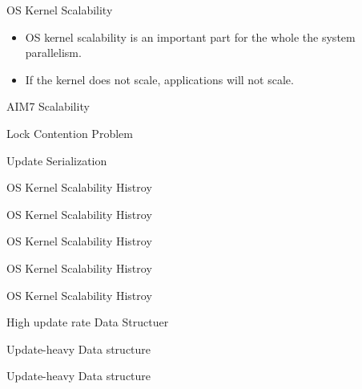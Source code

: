 \documentclass[english]{beamer} %
\begin{document}
\begin{frame}{OS Kernel Scalability}
    \begin{itemize}[<+-| alert@+>]
    \item OS kernel scalability is an important part for the whole the system
    parallelism.
    \item If the kernel does not scale, applications will not scale.
    \end{itemize}
\end{frame}


\begin{frame}{AIM7 Scalability}
\end{frame}


\begin{frame}{Lock Contention Problem}

\end{frame}


\begin{frame}{Update Serialization}

\end{frame}



\begin{frame}{OS Kernel Scalability Histroy}
\end{frame}


\begin{frame}{OS Kernel Scalability Histroy}
\end{frame}


\begin{frame}{OS Kernel Scalability Histroy}
\end{frame}


\begin{frame}{OS Kernel Scalability Histroy}
\end{frame}


\begin{frame}{OS Kernel Scalability Histroy}
\end{frame}


\begin{frame}{High update rate Data Structuer}
\end{frame}



\begin{frame}{Update-heavy Data structure}
\end{frame}



\begin{frame}{Update-heavy Data structure}
\end{frame}
\end{document}
